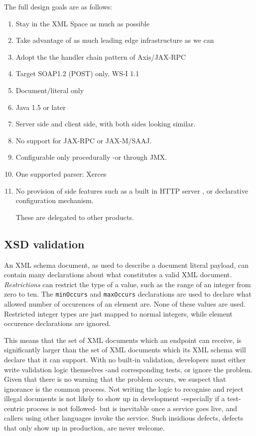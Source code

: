 The full design goals are as follows:

\begin{enumerate}

\item Stay in the XML Space as much as possible
\item Take advantage of as much leading edge infrastructure as we can
\item Adopt the the handler chain pattern of Axis/JAX-RPC
\item Target SOAP1.2 (POST) only, WS-I 1.1
\item Document/literal only
\item Java 1.5 or later 
\item Server side and client side, with both sides looking similar. 
\item No support for JAX-RPC or JAX-M/SAAJ.
\item Configurable only procedurally -or through JMX. 
\item One supported parser: Xerces

\item No provision of side features such as a built in HTTP server , or
declarative configuration mechanism.

These are delegated to other products.
\end{enumerate}

\subsection{XSD validation}
\label{alpine:validation}

An XML schema document, as used to describe a document literal
payload, can contain many declarations about what constitutes a valid
XML document. \emph{Restrictions} can restrict the type of a value,
such as the range of an integer from zero to ten. The \verb|minOccurs|
and \verb|maxOccurs| declarations are used to declare what allowed
number of occurences of an element are. None of these values are
used. Restricted integer types are just mapped to normal integers,
while element occurence declarations are ignored.

This means that the set of XML documents which an endpoint can
receive, is significantly larger than the set of XML documents which
its XML schema will declare that it can support. With no built-in
validation, developers must either write validation logic themselves
-and corresponding tests, or ignore the problem. Given that there is
no warning that the problem occurs, we suspect that ignorance is the
common process. Not writing the logic to recognise and reject illegal
documents is not likely to show up in development -especially if a
test-centric process is not followed- but is inevitable once a service
goes live, and callers using other languages invoke the service. Such
insidious defects, defects that only show up in production, are never
welcome.

